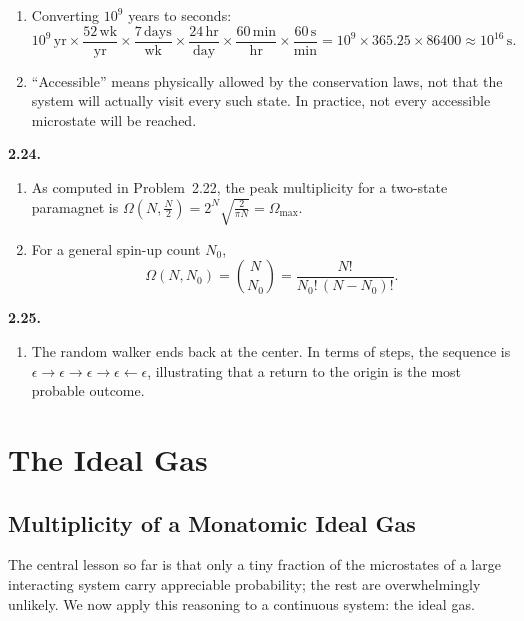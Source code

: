 

\begin{enumerate}
  \item[b)] Converting $10^9$ years to seconds:
  \[
    10^9 \,\text{yr} \times \frac{52\,\text{wk}}{\text{yr}} \times \frac{7\,\text{days}}{\text{wk}}
    \times \frac{24\,\text{hr}}{\text{day}} \times \frac{60\,\text{min}}{\text{hr}}
    \times \frac{60\,\text{s}}{\text{min}}
    = 10^9 \times 365.25 \times 86400 \approx 10^{16}\,\text{s}.
  \]

  \item[c)] ``Accessible'' means physically allowed by the conservation laws, not that the system will
  actually visit every such state. In practice, not every accessible microstate will be reached.
\end{enumerate}

\textbf{2.24.}
\begin{enumerate}
  \item[a)] As computed in Problem~2.22, the peak multiplicity for a two-state paramagnet is
  $\Omega\!\left(N,\tfrac{N}{2}\right) = 2^N\!\sqrt{\tfrac{2}{\pi N}} = \Omega_{\max}$.

  \item[b)] For a general spin-up count $N_0$,
  \[
    \Omega(N, N_0) = \binom{N}{N_0} = \frac{N!}{N_0!\,(N-N_0)!}.
  \]
\end{enumerate}

\textbf{2.25.}
\begin{enumerate}
  \item[a)] The random walker ends back at the center. In terms of steps, the sequence is
  $\epsilon \to \epsilon \to \epsilon \to \epsilon \leftarrow \epsilon$, illustrating that a return
  to the origin is the most probable outcome.
\end{enumerate}


\section{The Ideal Gas}

\subsection{Multiplicity of a Monatomic Ideal Gas}

The central lesson so far is that only a tiny fraction of the microstates of a large interacting
system carry appreciable probability; the rest are overwhelmingly unlikely. We now apply this
reasoning to a continuous system: the ideal gas.

